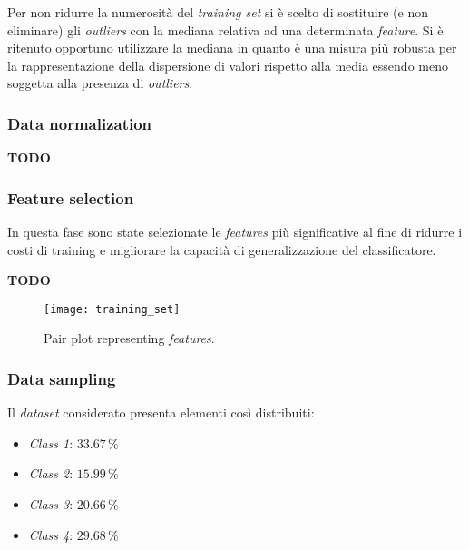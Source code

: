                         Per non ridurre la numerosità del \textit{training set} si è scelto di sostituire (e non eliminare) gli \textit{outliers} con la mediana relativa ad una determinata \textit{feature}. Si è ritenuto opportuno utilizzare la mediana in quanto è una misura più robusta per la rappresentazione della dispersione di valori rispetto alla media essendo meno soggetta alla presenza di \textit{outliers}.                        
                
                \subsubsection{Data normalization}
                
                        \textbf{TODO}
                
                \subsubsection{Feature selection}
                
                        In questa fase sono state selezionate le \textit{features} più significative al fine di ridurre i costi di training e migliorare la capacità di generalizzazione del classificatore.
                        
                        \textbf{TODO}
                        
                        \begin{figure}[!h]
                            \centering
                            \texttt{[image: training\_set]}
                            \caption{Pair plot representing \textit{features}.}
                            \label{fig:training_set_pairplot}
                        \end{figure}
                        \clearpage
                
                \subsubsection{Data sampling} 
                
                        Il \textit{dataset} considerato presenta elementi così distribuiti:
                        \begin{itemize}
                                \item \textit{Class 1}: $33.67 \, \%$
                                \item \textit{Class 2}: $15.99 \, \%$
                                \item \textit{Class 3}: $20.66 \, \%$
                                \item \textit{Class 4}: $29.68 \, \%$
                        \end{itemize}
                        
